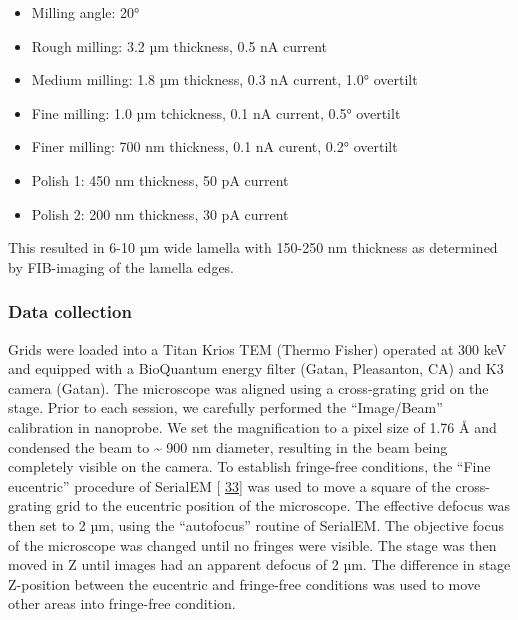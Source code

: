 \documentclass[
]{article}
\providecommand{\tightlist}{%
  \setlength{\itemsep}{0pt}\setlength{\parskip}{0pt}}
\providecommand{\DIFaddbegin}{} %
\providecommand{\DIFaddend}{} %
\providecommand{\DIFdelbegin}{} %
\providecommand{\DIFdelend}{} %
\newcommand{\DIFscaledelfig}{0.5}
\newlength{\DIFdelgraphicswidth} %
\newlength{\DIFdelgraphicsheight} %
\newcommand{\DIFaddincludegraphics}[2][]{{\color{blue}\fbox{\DIFOincludegraphics[#1]{#2}}}} %
\newcommand{\DIFdelincludegraphics}[2][]{%
\sbox{\DIFdelgraphicsbox}{\DIFOincludegraphics[#1]{#2}}%
\settoboxwidth{\DIFdelgraphicswidth}{\DIFdelgraphicsbox} %
\settoboxtotalheight{\DIFdelgraphicsheight}{\DIFdelgraphicsbox} %
\scalebox{\DIFscaledelfig}{%
\parbox[b]{\DIFdelgraphicswidth}{\usebox{\DIFdelgraphicsbox}\\[-\baselineskip] \rule{\DIFdelgraphicswidth}{0em}}\llap{\resizebox{\DIFdelgraphicswidth}{\DIFdelgraphicsheight}{%
\setlength{\unitlength}{\DIFdelgraphicswidth}%
\begin{picture}(1,1)%
\thicklines\linethickness{2pt} %
{\color[rgb]{1,0,0}\put(0,0){\framebox(1,1){}}}%
{\color[rgb]{1,0,0}\put(0,0){\line( 1,1){1}}}%
{\color[rgb]{1,0,0}\put(0,1){\line(1,-1){1}}}%
\end{picture}%
}\hspace*{3pt}}} %
} %
\DeclareRobustCommand{\DIFaddbegin}{\DIFOaddbegin \let\includegraphics\DIFaddincludegraphics} %
\DeclareRobustCommand{\DIFaddend}{\DIFOaddend \let\includegraphics\DIFOincludegraphics} %
\DeclareRobustCommand{\DIFdelbegin}{\DIFOdelbegin \let\includegraphics\DIFdelincludegraphics} %
\DeclareRobustCommand{\DIFdelend}{\DIFOaddend \let\includegraphics\DIFOincludegraphics} %
\begin{document}
\begin{itemize}
\tightlist
\item
  Milling angle: 20°
\item
  Rough milling: 3.2 µm thickness, 0.5 nA current
\item
  Medium milling: 1.8 µm thickness, 0.3 nA current, 1.0° overtilt
\item
  Fine milling: 1.0 µm tchickness, 0.1 nA current, 0.5° overtilt
\item
  Finer milling: 700 nm thickness, 0.1 nA curent, 0.2° overtilt
\item
  Polish 1: 450 nm thickness, 50 pA current
\item
  Polish 2: 200 nm thickness, 30 pA current
\end{itemize}

This resulted in 6-10 µm wide lamella with 150-250 nm thickness as
determined by FIB-imaging of the lamella edges.

\hypertarget{data-collection}{%
\subsubsection{Data collection}\label{data-collection}}

Grids were loaded into a Titan Krios TEM (Thermo Fisher) operated at 300
keV and equipped with a BioQuantum energy filter (Gatan, Pleasanton, CA)
and K3 camera (Gatan). The microscope was aligned using a cross-grating
grid on the stage. Prior to each session, we carefully performed the
``Image/Beam'' calibration in nanoprobe. We set the magnification to a
pixel size of 1.76 Å and condensed the beam to \textasciitilde{} 900 nm diameter,
resulting in the beam being completely visible on the camera. To
establish fringe-free conditions, the ``Fine eucentric'' procedure of
SerialEM {[}\protect\DIFdelbegin %
\DIFdelend \DIFaddbegin \hyperlink{ref-19ZFerhph}{33}{]} \DIFaddend was used to move a square of
the cross-grating grid to the eucentric position of the microscope. The
effective defocus was then set to 2 µm, using the ``autofocus'' routine of
SerialEM. The objective focus of the microscope was changed until no
fringes were visible. The stage was then moved in Z until images had an
apparent defocus of 2 µm. The difference in stage Z-position between the
eucentric and fringe-free conditions was used to move other areas into
fringe-free condition.
\end{document}

